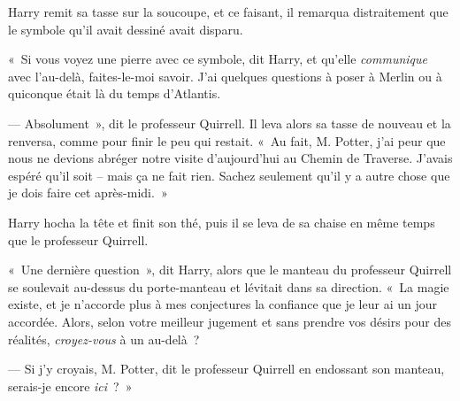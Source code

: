Harry remit sa tasse sur la soucoupe, et ce faisant, il remarqua distraitement que le symbole qu'il avait dessiné avait disparu.

«~Si vous voyez une pierre avec ce symbole, dit Harry, et qu'elle \emph{communique} avec l'au-delà, faites-le-moi savoir. J'ai quelques questions à poser à Merlin ou à quiconque était là du temps d'Atlantis.

--- Absolument~», dit le professeur Quirrell. Il leva alors sa tasse de nouveau et la renversa, comme pour finir le peu qui restait. «~Au fait, M. Potter, j'ai peur que nous ne devions abréger notre visite d'aujourd'hui au Chemin de Traverse. J'avais espéré qu'il soit -- mais ça ne fait rien. Sachez seulement qu'il y a autre chose que je dois faire cet après-midi.~»

Harry hocha la tête et finit son thé, puis il se leva de sa chaise en même temps que le professeur Quirrell.

«~Une dernière question~», dit Harry, alors que le manteau du professeur Quirrell se soulevait au-dessus du porte-manteau et lévitait dans sa direction. «~La magie existe, et je n'accorde plus à mes conjectures la confiance que je leur ai un jour accordée. Alors, selon votre meilleur jugement et sans prendre vos désirs pour des réalités, \emph{croyez-vous} à un au-delà~?

--- Si j'y croyais, M. Potter, dit le professeur Quirrell en endossant son manteau, serais-je encore \emph{ici}~?~»

